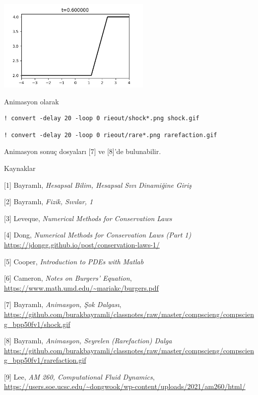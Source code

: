 \documentclass[12pt,fleqn]{article}\usepackage{../../common}
\begin{document}
\includegraphics[width=20em]{rieout/rarefaction-6.png}

Animasyon olarak

\begin{verbatim}
! convert -delay 20 -loop 0 rieout/shock*.png shock.gif
\end{verbatim}

\begin{verbatim}
! convert -delay 20 -loop 0 rieout/rare*.png rarefaction.gif
\end{verbatim}

Animasyon sonuç dosyaları [7] ve [8]'de bulunabilir.

Kaynaklar

[1] Bayramlı, {\em Hesapsal Bilim, Hesapsal Sıvı Dinamiğine Giriş}

[2] Bayramlı, {\em Fizik, Sıvılar, 1}

[3] Leveque, {\em Numerical Methods for Conservation Laws}

[4] Dong, {\em Numerical Methods for Conservation Laws (Part 1)}
    \url{https://jdongg.github.io/post/conservation-laws-1/}

[5] Cooper, {\em Introduction to PDEs with Matlab}

[6] Cameron, {\em Notes on Burgers' Equation},
    \url{https://www.math.umd.edu/~mariakc/burgers.pdf}

[7] Bayramlı, {\em Animasyon, Şok Dalgası},
    \url{https://github.com/burakbayramli/classnotes/raw/master/compscieng/compscieng_bpp50fv1/shock.gif}

[8] Bayramlı, {\em Animasyon, Seyrelen (Rarefaction) Dalga}
    \url{https://github.com/burakbayramli/classnotes/raw/master/compscieng/compscieng_bpp50fv1/rarefaction.gif}

[9] Lee, {\em AM 260, Computational Fluid Dynamics},
    \url{https://users.soe.ucsc.edu/~dongwook/wp-content/uploads/2021/am260/html/}
\end{document}
